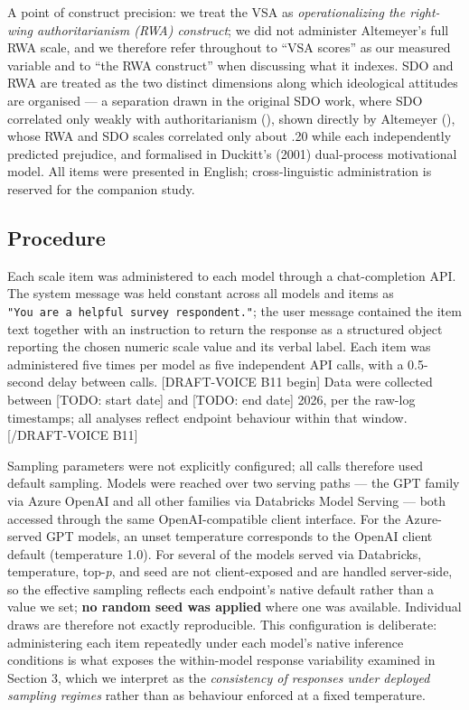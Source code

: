 \documentclass[
]{article}
\begin{document}
A point of construct precision: we treat the VSA as
\emph{operationalizing the right-wing authoritarianism (RWA) construct};
we did not administer Altemeyer's full RWA scale, and we therefore refer
throughout to ``VSA scores'' as our measured variable and to ``the RWA
construct'' when discussing what it indexes. SDO and RWA are treated as
the two distinct dimensions along which ideological attitudes are
organised --- a separation drawn in the original SDO work, where SDO
correlated only weakly with authoritarianism
(), shown directly by
Altemeyer (), whose RWA and SDO scales
correlated only about .20 while each independently predicted prejudice,
and formalised in Duckitt's (2001) dual-process motivational model. All
items were presented in English; cross-linguistic administration is
reserved for the companion study.

\subsection{Procedure}\label{procedure}

Each scale item was administered to each model through a chat-completion
API. The system message was held constant across all models and items as
\texttt{"You\ are\ a\ helpful\ survey\ respondent."}; the user message
contained the item text together with an instruction to return the
response as a structured object reporting the chosen numeric scale value
and its verbal label. Each item was administered five times per model as
five independent API calls, with a 0.5-second delay between calls.
{[}DRAFT-VOICE B11 begin{]} Data were collected between {[}TODO: start
date{]} and {[}TODO: end date{]} 2026, per the raw-log timestamps; all
analyses reflect endpoint behaviour within that window. {[}/DRAFT-VOICE
B11{]}

Sampling parameters were not explicitly configured; all calls therefore
used default sampling. Models were reached over two serving paths ---
the GPT family via Azure OpenAI and all other families via Databricks
Model Serving --- both accessed through the same OpenAI-compatible
client interface. For the Azure-served GPT models, an unset temperature
corresponds to the OpenAI client default (temperature 1.0). For several
of the models served via Databricks, temperature, top-\emph{p}, and seed
are not client-exposed and are handled server-side, so the effective
sampling reflects each endpoint's native default rather than a value we
set; \textbf{no random seed was applied} where one was available.
Individual draws are therefore not exactly reproducible. This
configuration is deliberate: administering each item repeatedly under
each model's native inference conditions is what exposes the
within-model response variability examined in Section 3, which we
interpret as the \emph{consistency of responses under deployed sampling
regimes} rather than as behaviour enforced at a fixed temperature.
\end{document}
